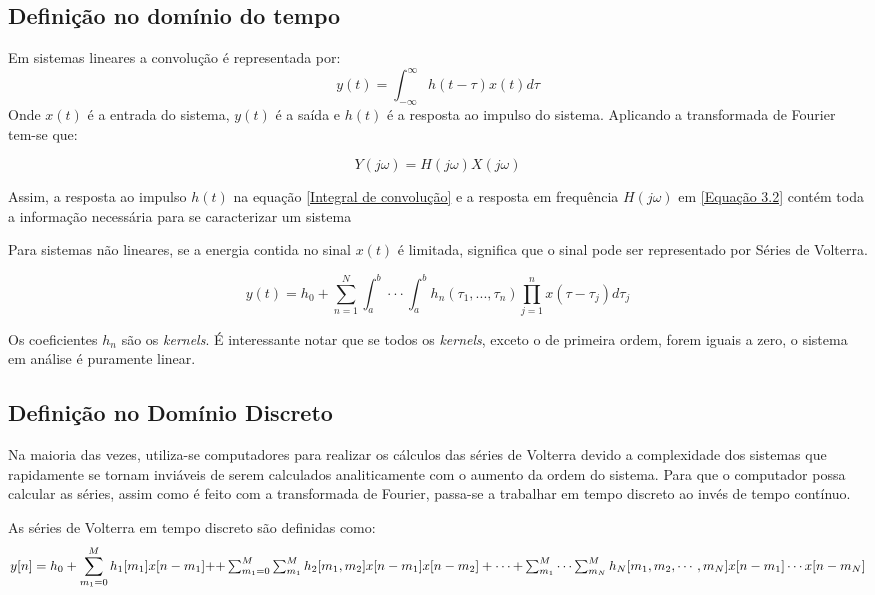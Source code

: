 \subsection*{Definição no domínio do tempo}
Em sistemas lineares a convolução é representada por:
\begin{equation}
y(t) = \int_{-\infty}^{\infty} h(t-\tau)x(t)d\tau
\label{Integral de convolução}
\end{equation}
Onde $x(t)$ é a entrada do sistema, $y(t)$ é a saída e $h(t)$ é a resposta ao impulso do sistema. Aplicando a transformada de Fourier tem-se que:

\begin{equation}
Y(j\omega) = H(j\omega)X(j\omega)
\label{Equação 3.2}
\end{equation}

Assim, a resposta ao impulso $h(t)$ na equação \ref{Integral de convolução} e a resposta em frequência $H(j\omega)$ em \ref{Equação 3.2} contém toda a informação necessária para se caracterizar um sistema \cite{cheng2017volterra}

Para sistemas não lineares, se a energia contida no sinal $x(t)$ é limitada, significa que o sinal pode ser representado por Séries de Volterra.

\begin{equation}
y(t)=h_{0} + \sum_{n=1}^{N} \int_{a}^{b}\cdot\cdot\cdot\int_{a}^{b} h_{n}(\tau_{1},...,\tau_{n})\prod_{j=1}^{n}x(\tau - \tau_{j})d\tau_{j}
\label{Equação de Volterra}
\end{equation}

Os coeficientes $h_{n}$ são os \textit{kernels}. É interessante notar que se todos os \textit{kernels}, exceto o de primeira ordem, forem iguais a zero, o sistema em análise é puramente linear.



\subsection*{Definição no Domínio Discreto}
Na maioria das vezes, utiliza-se computadores para realizar os cálculos das séries de Volterra devido a complexidade dos sistemas que rapidamente se tornam inviáveis de serem calculados analiticamente com o aumento da ordem do sistema. Para que o computador possa calcular as séries, assim como é feito com a transformada de Fourier, passa-se a trabalhar em tempo discreto ao invés de tempo contínuo. 

As séries de Volterra em tempo discreto são definidas como:
\begin{equation}
y[n]= h_{0} + \sum_{m_{1}=0}^{M} h_{1}[m_{1}]x[n-m_{1}]+$$
$$ +\sum_{m_{1}=0}^{M} \sum_{m_1}^{M}h_{2}[m_{1},m_{2}]x[n-m_{1}]x[n-m_{2}]+ \cdots$$
$$+ \sum_{m_{1}}^{M} \cdots \sum_{m_{N}}^{M}h_{N}[m_{1},m_{2},\cdots,m_{N}]x[n-m_{1}]\cdots x[n-m_{N}]
\label{Equação 3.4}
\end{equation}

